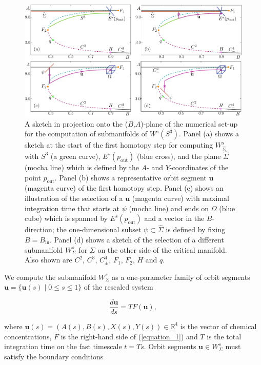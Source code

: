 \documentclass{ws-ijbc}
\begin{document}
\begin{figure}[h]
\centering
\includegraphics[]{./figures/MKMO_3.pdf}
\caption{A sketch in projection onto the ($B$,$A$)-plane of the numerical set-up for the computation of submanifolds of $W^s(S^3)$.  Panel (a) shows a sketch at the start of the first homotopy step for computing $W^{s}_{\widehat{\Sigma}}$ with $S^3$ (a green curve), $E^s(p_{\text{out}})$ (blue cross), and the plane $\widehat{\Sigma}$ (mocha line) which is defined by the $A$- and $Y$-coordinates of the point $p_{\text{out}}$.  Panel (b) shows a representative orbit segment $\mathbf{u}$ (magenta curve) of the first homotopy step.  Panel (c) shows an illustration of the selection of a $\mathbf{u}$ (magenta curve) with maximal integration time that starts at $\psi$ (mocha line) and ends on $\Omega$ (blue cube) which is spanned by $E^s(p_{\text{out}})$ and a vector in the $B$-direction; the one-dimensional subset $\psi \subset \widehat{\Sigma}$ is defined by fixing $B = B_{\text{in}}$.  Panel (d) shows a sketch of the selection of a different submanifold $W^{s}_{\Sigma}$ for $\Sigma$ on the other side of the critical manifold.  Also shown are $C^2$, $C^3$, $C^4_\pm$, $F_1$, $F_2$, $H$ and $q$.}
\label{figure_3}
\end{figure}


We compute the submanifold $W^s_{\Sigma}$ as a one-parameter family of orbit segments $\mathbf{u} = \{\mathbf{u}(s) \;|\; 0 \leq s \leq 1 \}$ of the rescaled system

\begin{equation}
\frac{d\mathbf{u}}{ds} = TF(\mathbf{u}),
\label{equation_4}
\end{equation}
    
\noindent
where $\mathbf{u}(s) = (A(s), B(s), X(s), Y(s)) \in \mathbb{R}^4$ is the vector of chemical concentrations, $F$ is the right-hand side of (\ref{equation_1}) and $T$ is the total integration time on the fast timescale $t=Ts$.  Orbit segments $\mathbf{u} \in W^s_{\Sigma}$ must satisfy the boundary conditions
\end{document}
